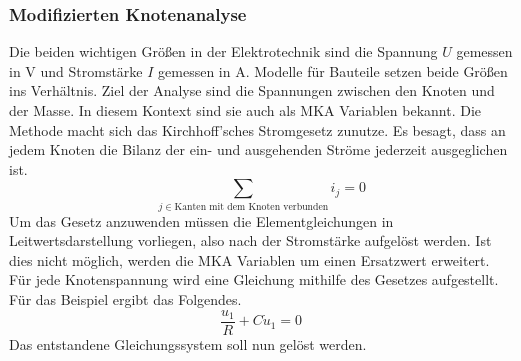 \subsubsection*{Modifizierten Knotenanalyse}
Die beiden wichtigen Größen in der Elektrotechnik sind die Spannung $U$ gemessen in V und Stromstärke $I$ gemessen in A. Modelle für Bauteile setzen beide Größen ins Verhältnis. Ziel der Analyse sind die Spannungen zwischen den Knoten und der Masse. In diesem Kontext sind sie auch als MKA Variablen bekannt. Die Methode macht sich das Kirchhoff’sches Stromgesetz zunutze. Es besagt, dass an jedem Knoten die Bilanz der ein- und ausgehenden Ströme jederzeit ausgeglichen ist.
\begin{displaymath}
    \sum_{j \in \textrm{Kanten mit dem Knoten verbunden}} i_{j} = 0
\end{displaymath}
Um das Gesetz anzuwenden müssen die Elementgleichungen in Leitwertsdarstellung vorliegen, also nach der Stromstärke aufgelöst werden. Ist dies nicht möglich, werden die MKA Variablen um einen Ersatzwert erweitert. Für jede Knotenspannung wird eine Gleichung mithilfe des Gesetzes aufgestellt. Für das Beispiel ergibt das Folgendes.
\begin{displaymath}
    \frac{u_1}{R} + C\dot{u}_1 = 0
\end{displaymath}
Das entstandene Gleichungssystem soll nun gelöst werden.